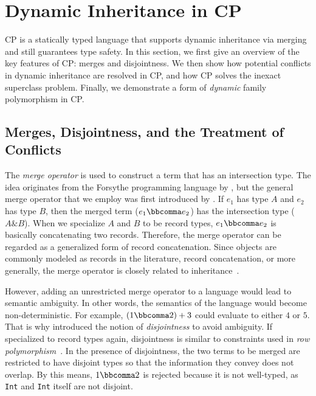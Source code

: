 \section{Dynamic Inheritance in CP} \label{sec:overview}

CP is a statically typed language that supports dynamic inheritance via merging
and still guarantees type safety. In this section, we first give an overview of
the key features of CP: merges and disjointness. We then show how potential
conflicts in dynamic inheritance are resolved in CP, and how CP solves the
inexact superclass problem. Finally, we demonstrate a form of \emph{dynamic}
family polymorphism in CP.

\subsection{Merges, Disjointness, and the Treatment of Conflicts}\label{sec:merge}

The \emph{merge operator} is used to construct a term that has an intersection
type. The idea originates from the Forsythe programming language by
\citet{reynolds1997design}, but the general merge operator that we employ was
first introduced by \citet{dunfield2014elaborating}. If $e_1$ has type $A$ and
$e_2$ has type $B$, then the merged term ($e_1 \bbcomma e_2$) has the
intersection type ($A\&B$). When we specialize $A$ and $B$ to be record types,
$e_1 \bbcomma e_2$ is basically concatenating two records. Therefore, the merge
operator can be regarded as a generalized form of record concatenation. Since
objects are commonly modeled as records in the literature, record concatenation,
or more generally, the merge operator is closely related to
inheritance~\citep{wand1991type,cook1989denotational}.

However, adding an unrestricted merge operator to a language would lead to
semantic ambiguity. In other words, the semantics of the language would become
non-deterministic. For example, $(1\bbcomma2)+3$ could evaluate to either $4$ or
$5$. That is why \citet{oliveira2016disjoint} introduced the notion of
\emph{disjointness} to avoid ambiguity. If specialized to record types again,
disjointness is similar to constraints used in \emph{row
polymorphism}~\citep{harper1991record}. In the presence of disjointness, the two
terms to be merged are restricted to have disjoint types so that the information
they convey does not overlap. By this means, $1\bbcomma2$ is rejected because it
is not well-typed, as \lstinline{Int} and \lstinline{Int} itself are not
disjoint.

